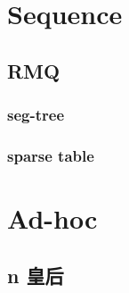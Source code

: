 \section{Sequence}

\subsection{RMQ}

\subsubsection{seg-tree}


\subsubsection{sparse table}


\section{Ad-hoc}

\subsection{n 皇后}
